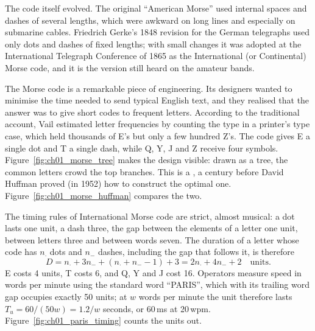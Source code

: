 The code itself evolved. The original ``American Morse'' used internal spaces and dashes of several
lengths, which were awkward on long lines and especially on submarine cables. Friedrich Gerke's 1848
revision for the German telegraphs used only dots and dashes of fixed lengths; with small changes it
was adopted at the International Telegraph Conference of 1865 as the International (or Continental)
Morse code, and it is the version still heard on the amateur bands.


The Morse code is a remarkable piece of engineering. Its designers wanted to minimise the time needed
to send typical English text, and they realised that the answer was to give short codes to frequent
letters. According to the traditional account, Vail estimated letter frequencies by counting the type
in a printer's type case, which held thousands of E's but only a few hundred Z's. The code gives E a
single dot and T a single dash, while Q, Y, J and Z receive four symbols.
Figure~\ref{fig:ch01_morse_tree} makes the design visible: drawn as a tree, the common letters crowd
the top branches. This is a , a century before David Huffman proved
(in 1952) how to construct the optimal one. Figure~\ref{fig:ch01_morse_huffman} compares the two.


The timing rules of International Morse code are strict, almost musical: a dot lasts one unit, a dash
three, the gap between the elements of a letter one unit, between letters three and between words
seven. The duration of a letter whose code has $n_\cdot$ dots and $n_-$ dashes, including the gap
that follows it, is therefore
\begin{equation}
D = n_\cdot + 3n_- + (n_\cdot+n_- - 1) + 3 = 2n_\cdot + 4n_- + 2 \quad\text{units}.
\label{eq:ch01:morsedur}
\end{equation}
E costs 4 units, T costs 6, and Q, Y and J cost 16. Operators measure speed in words per minute
using the standard word ``PARIS'', which with its trailing word gap occupies exactly 50 units; at
$w$ words per minute the unit therefore lasts $T_u = 60/(50w) = 1.2/w$ seconds, or 60\,ms at
20\,wpm. Figure~\ref{fig:ch01_paris_timing} counts the units out.

